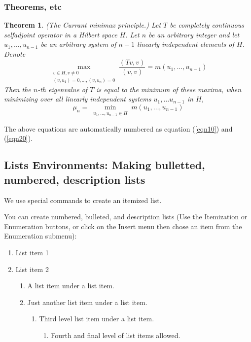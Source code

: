 \documentclass{book}\usepackage{knitr}
\newtheorem{theorem}{Theorem}
\begin{document}
\subsubsection{Theorems, etc}
\begin{theorem}
(The Currant minimax principle.) Let $T$ be completely continuous selfadjoint operator
in a Hilbert space $H$. Let $n$ be an arbitrary integer and let $u_1,\ldots,u_{n-1}$ be
an arbitrary system of $n-1$ linearly independent elements of $H$. Denote
\begin{equation}
\max_{\substack{v\in H, v\neq
0\\(v,u_1)=0,\ldots,(v,u_n)=0}}\frac{(Tv,v)}{(v,v)}=m(u_1,\ldots, u_{n-1})
\label{eqn10}
\end{equation}
Then the $n$-th eigenvalue of $T$ is equal to the minimum of these maxima, when
minimizing over all linearly independent systems $u_1,\ldots u_{n-1}$ in $H$,
\begin{equation}
\mu_n = \min_{\substack{u_1,\ldots, u_{n-1}\in H}} m(u_1,\ldots, u_{n-1}) \label{eqn20}
\end{equation}
\end{theorem}
The above equations are automatically numbered as equation (\ref{eqn10}) and
(\ref{eqn20}).


\subsection{Lists Environments: Making bulletted, numbered, description lists}

We use special commands to create an itemized list.

You can create numbered, bulleted, and description lists
(Use the Itemization or Enumeration buttons, or click on the Insert menu
then chose an item from the Enumeration submenu):

\begin{enumerate}
\item List item 1

\item List item 2

\begin{enumerate}
\item A list item under a list item.

\item Just another list item under a list item.

\begin{enumerate}
\item Third level list item under a list item.

\begin{enumerate}
\item Fourth and final level of list items allowed.
\end{enumerate}
\end{enumerate}
\end{enumerate}
\end{enumerate}
\end{document}
